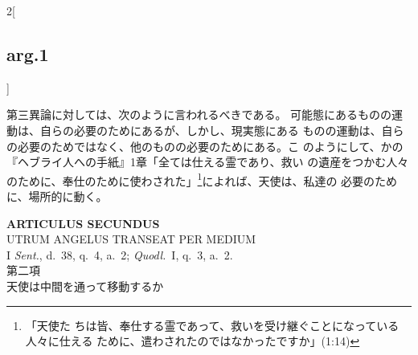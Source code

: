 \documentclass[paper=a4paper,fontsize=10pt,jafontsize=9pt,titlepage]{jlreq}
\begin{document}
\begin{paracol}{2}[\subsection{arg.1}]
\switchcolumn

第三異論に対しては、次のように言われるべきである。
可能態にあるものの運動は、自らの必要のためにあるが、しかし、現実態にある
 ものの運動は、自らの必要のためではなく、他のものの必要のためにある。こ
 のようにして、かの『ヘブライ人への手紙』1章「全ては仕える霊であり、救い
 の遺産をつかむ人々のために、奉仕のために使わされた」\footnote{「天使た
 ちは皆、奉仕する霊であって、救いを受け継ぐことになっている人々に仕える
 ために、遣わされたのではなかったですか」(1:14)}によれば、天使は、私達の
 必要のために、場所的に動く。

\end{paracol}


\newpage
{}
{}
\setcounter{section}{2}
\setcounter{subsection}{0}


\begin{center}
 {\Large {\bfseries ARTICULUS SECUNDUS}}\\
 {\large UTRUM ANGELUS TRANSEAT PER MEDIUM}\\
 {\footnotesize I {\itshape Sent.}, d.~38, q.~4, a.~2; {\itshape
 Quodl.}~I, q.~3, a.~2.}\\
 {\Large 第二項\\天使は中間を通って移動するか}
\end{center}
\end{document}
